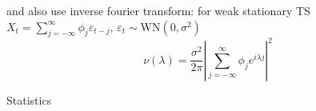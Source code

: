 \begin{itemize}[topsep=2pt,itemsep=0pt]
\begin{itemize}[topsep=2pt,itemsep=0pt]
            and also use inverse fourier transform: for weak stationary TS $ X_t=\sum_{j=-\infty}^\infty \phi _j\varepsilon _{t-j} $, $ \varepsilon _t\sim \mathrm{WN}(0,\sigma ^2)  $
            \begin{equation}
                \nu (\lambda )= \dfrac{\sigma ^2}{2\pi}\left\vert \sum_{j=-\infty}^\infty \phi _je^{i\lambda j} \right\vert ^2
            \end{equation}
            
            
            
        \end{itemize}
        
            

        
        
        
    \end{itemize}

\begin{point}
    Statistics
\end{point}


